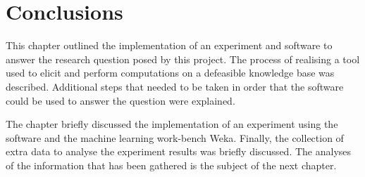 \section{Conclusions}

This chapter outlined the implementation of an experiment and software to answer the research question posed by this project. The process of realising a tool used to elicit and perform computations on a defeasible knowledge base was described. Additional steps that needed to be taken in order that the software could be used to answer the question were explained.

The chapter briefly discussed the implementation of an experiment using the software and the machine learning work-bench Weka. Finally, the collection of extra data to analyse the experiment results was briefly discussed. The analyses of the information that has been gathered is the subject of the next chapter.